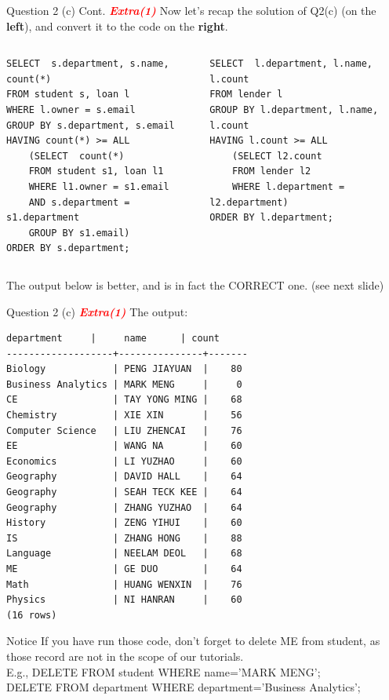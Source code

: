 \begin{frame}[fragile]{Question 2 (c) Cont. \textcolor{red}{\textit{\textbf{Extra(1)}}}}
Now let's recap the solution of Q2(c) (on the \textbf{left}), and convert it to the code on the \textbf{right}.

\begin{columns}[t]
	
\begin{lstlisting}[style=sql-small]
SELECT  s.department, s.name, count(*)
FROM student s, loan l
WHERE l.owner = s.email
GROUP BY s.department, s.email
HAVING count(*) >= ALL
	(SELECT  count(*) 
	FROM student s1, loan l1
	WHERE l1.owner = s1.email
	AND s.department = s1.department
	GROUP BY s1.email)
ORDER BY s.department;
\end{lstlisting}

\begin{lstlisting}[style=sql-small]
SELECT  l.department, l.name, l.count
FROM lender l
GROUP BY l.department, l.name, l.count
HAVING l.count >= ALL
	(SELECT l2.count 
	FROM lender l2
	WHERE l.department = l2.department)
ORDER BY l.department;
\end{lstlisting}

\end{columns}

The output below is better, and is in fact the CORRECT one. (see next slide)

\end{frame}

\begin{frame}[fragile]{Question 2 (c) \textcolor{red}{\textit{\textbf{Extra(1)}}}}
The output:

\begin{lstlisting}[style=terminal-tiny]
    department     |     name      | count 
-------------------+---------------+-------
Biology            | PENG JIAYUAN  |    80
Business Analytics | MARK MENG     |     0
CE                 | TAY YONG MING |    68
Chemistry          | XIE XIN       |    56
Computer Science   | LIU ZHENCAI   |    76
EE                 | WANG NA       |    60
Economics          | LI YUZHAO     |    60
Geography          | DAVID HALL    |    64
Geography          | SEAH TECK KEE |    64
Geography          | ZHANG YUZHAO  |    64
History            | ZENG YIHUI    |    60
IS                 | ZHANG HONG    |    88
Language           | NEELAM DEOL   |    68
ME                 | GE DUO        |    64
Math               | HUANG WENXIN  |    76
Physics            | NI HANRAN     |    60
(16 rows)
\end{lstlisting}

\begin{alertblock}{Notice}
	If you have run those code, don't forget to delete ME from student, as those record are not in the scope of our tutorials.\\
	E.g., DELETE FROM student WHERE name='MARK MENG';\\
	DELETE FROM department WHERE department='Business Analytics';
\end{alertblock}
\end{frame}

